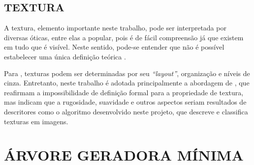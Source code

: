 


\subsection{TEXTURA}
\par A textura, elemento importante neste trabalho, pode ser interpretada por diversas óticas, entre elas a popular, pois é de fácil compreensão já que existem em tudo que é visível. Neste sentido, pode-se entender que não é possível estabelecer uma única definição teórica \cite{liberman1997}. 
\par Para , texturas podem ser determinadas por seu \textit{``layout''}, organização e níveis de cinza. Entretanto, neste trabalho é adotada principalmente a abordagem de , que reafirmam a impossibilidade de definição formal para a propriedade de textura, mas indicam que a rugosidade, suavidade e outros aspectos seriam resultados de descritores como o algoritmo desenvolvido neste projeto, que descreve e classifica texturas em imagens. 

\section{ÁRVORE GERADORA MÍNIMA}
\label{sec:arvore}

